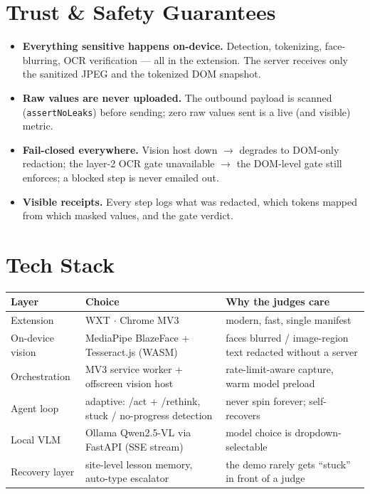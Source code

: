 \documentclass[11pt,a4paper]{article}
\begin{document}
\section{Trust \& Safety Guarantees}

\begin{itemize}
  \item \textbf{Everything sensitive happens on-device.} Detection, tokenizing,
        face-blurring, OCR verification --- all in the extension. The server
        receives only the sanitized JPEG and the tokenized DOM snapshot.
  \item \textbf{Raw values are never uploaded.} The outbound payload is
        scanned (\texttt{assertNoLeaks}) before sending; zero raw values sent
        is a live (and visible) metric.
  \item \textbf{Fail-closed everywhere.} Vision host down $\rightarrow$ degrades
        to DOM-only redaction; the layer-2 OCR gate unavailable $\rightarrow$
        the DOM-level gate still enforces; a blocked step is never emailed out.
  \item \textbf{Visible receipts.} Every step logs what was redacted, which
        tokens mapped from which masked values, and the gate verdict.
\end{itemize}

\section{Tech Stack}

\begin{table}[H]
\centering
\small
\begin{tabularx}{\textwidth}{l X l}
\toprule
\textbf{Layer} & \textbf{Choice} & \textbf{Why the judges care} \\
\midrule
Extension & WXT $\cdot$ Chrome MV3 & modern, fast, single manifest \\
On-device vision & MediaPipe BlazeFace + Tesseract.js (WASM) & faces blurred / image-region text redacted without a server \\
Orchestration & MV3 service worker + offscreen vision host & rate-limit-aware capture, warm model preload \\
Agent loop & adaptive: /act + /rethink, stuck / no-progress detection & never spin forever; self-recovers \\
Local VLM & Ollama Qwen2.5-VL via FastAPI (SSE stream) & model choice is dropdown-selectable \\
Recovery layer & site-level lesson memory, auto-type escalator & the demo rarely gets ``stuck'' in front of a judge \\
\bottomrule
\end{tabularx}
\end{table}
\end{document}

